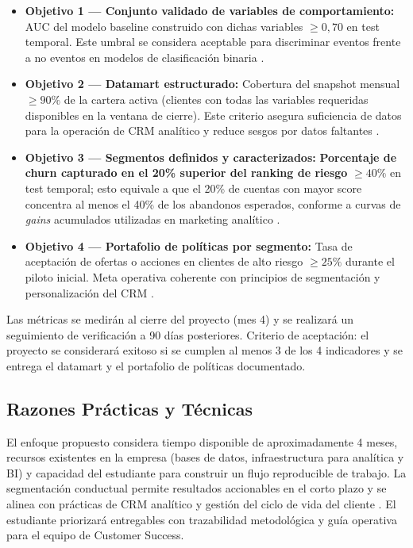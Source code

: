 \begin{itemize}
    \item \textbf{Objetivo 1 — Conjunto validado de variables de comportamiento:} AUC del modelo baseline construido con dichas variables \(\geq 0{,}70\) en test temporal. Este umbral se considera aceptable para discriminar eventos frente a no eventos en modelos de clasificación binaria \citep{Hosmer2013}.
    \item \textbf{Objetivo 2 — Datamart estructurado:} Cobertura del snapshot mensual \(\geq 90\%\) de la cartera activa (clientes con todas las variables requeridas disponibles en la ventana de cierre). Este criterio asegura suficiencia de datos para la operación de CRM analítico y reduce sesgos por datos faltantes \citep{Kumar2010}.
    \item \textbf{Objetivo 3 — Segmentos definidos y caracterizados:} \textbf{Porcentaje de churn capturado en el 20\% superior del ranking de riesgo} \(\geq 40\%\) en test temporal; esto equivale a que el 20\% de cuentas con mayor score concentra al menos el 40\% de los abandonos esperados, conforme a curvas de \textit{gains} acumulados utilizadas en marketing analítico \citep{SAS41683}.
    \item \textbf{Objetivo 4 — Portafolio de políticas por segmento:} Tasa de aceptación de ofertas o acciones en clientes de alto riesgo \(\geq 25\%\) durante el piloto inicial. Meta operativa coherente con principios de segmentación y personalización del CRM \citep{Kumar2010}.
\end{itemize}
Las métricas se medirán al cierre del proyecto (mes 4) y se realizará un seguimiento de verificación a 90 días posteriores. Criterio de aceptación: el proyecto se considerará exitoso si se cumplen al menos 3 de los 4 indicadores y se entrega el datamart y el portafolio de políticas documentado.


\subsection{Razones Prácticas y Técnicas}

El enfoque propuesto considera tiempo disponible de aproximadamente 4 meses, recursos existentes en la empresa (bases de datos, infraestructura para analítica y BI) y capacidad del estudiante para construir un flujo reproducible de trabajo. La segmentación conductual permite resultados accionables en el corto plazo y se alinea con prácticas de CRM analítico y gestión del ciclo de vida del cliente \citep{Kumar2010}. El estudiante priorizará entregables con trazabilidad metodológica y guía operativa para el equipo de Customer Success.

